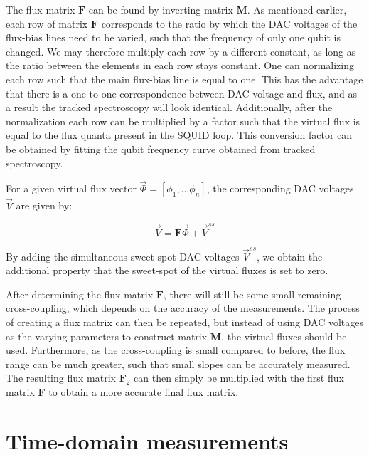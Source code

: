         The flux matrix $\boldsymbol{F}$ can be found by inverting matrix $\boldsymbol{M}$. As mentioned earlier, each row of matrix $\boldsymbol{F}$ corresponds to the ratio by which the DAC voltages of the flux-bias lines need to be varied, such that the frequency of only one qubit is changed. We may therefore multiply each row by a different constant, as long as the ratio between the elements in each row stays constant. One can normalizing each row such that the main flux-bias line is equal to one. This has the advantage that there is a one-to-one correspondence between DAC voltage and flux, and as a result the tracked spectroscopy will look identical. Additionally, after the normalization each row can be multiplied by a factor such that the virtual flux is equal to the flux quanta present in the SQUID loop. This conversion factor can be obtained by fitting the qubit frequency curve obtained from tracked spectroscopy.

        For a given virtual flux vector $\vec{\Phi}=\left[ \phi_1, \dots \phi_n \right]$, the corresponding DAC voltages $\vec{V}$ are given by:

        \begin{equation}
          \vec{V} = \boldsymbol{F} \vec{\Phi} + \vec{V}^{ss}
        \end{equation}

        By adding the simultaneous sweet-spot DAC voltages $\vec{V}^{ss}$, we obtain the additional property that the sweet-spot of the virtual fluxes is set to zero.

        After determining the flux matrix $\boldsymbol{F}$, there will still be some small remaining cross-coupling, which depends on the accuracy of the measurements. The process of creating a flux matrix can then be repeated, but instead of using DAC voltages as the varying parameters to construct matrix $\boldsymbol{M}$, the virtual fluxes should be used. Furthermore, as the cross-coupling is small compared to before, the flux range can be much greater, such that small slopes can be accurately measured. The resulting flux matrix $\boldsymbol{F}_2$ can then simply be multiplied with the first flux matrix $\boldsymbol{F}$ to obtain a more accurate final flux matrix.

    \section{Time-domain measurements}
